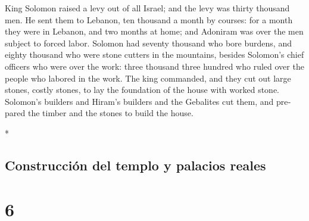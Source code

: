 \begin{paracol}{2}
\begin{otherlanguage}{english}
 King Solomon raised a levy out of all Israel; and the
levy was thirty thousand men.  He sent them to Lebanon,
ten thousand a month by courses: for a month they were in Lebanon, and
two months at home; and Adoniram was over the men subject to forced
labor.  Solomon had seventy thousand who bore burdens,
and eighty thousand who were stone cutters in the mountains,
 besides Solomon's chief officers who were over the work:
three thousand three hundred who ruled over the people who labored in
the work.  The king commanded, and they cut out large
stones, costly stones, to lay the foundation of the house with worked
stone.  Solomon's builders and Hiram's builders and the
Gebalites cut them, and prepared the timber and the stones to build the
house.

\end{otherlanguage}

\switchcolumn[0]*

\hypertarget{construcciuxf3n-del-templo-y-palacios-reales}{%
\subsection{Construcción del templo y palacios
reales}\label{construcciuxf3n-del-templo-y-palacios-reales}}

\hypertarget{section-10}{%
\section{6}\label{section-10}}


\end{paracol}
